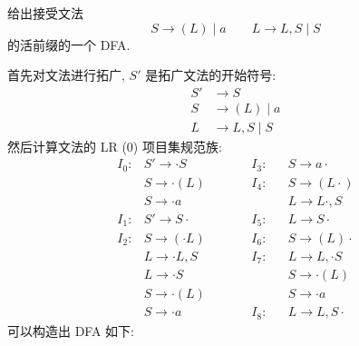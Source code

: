 \documentclass[boxes]{homework}
\begin{document}
\begin{problem}
给出接受文法
\begin{equation}
    \label{eq:17.1}
    S \to (L) \mid a \qquad L \to L, S \mid S
\end{equation}
的活前缀的一个 DFA\@.
\end{problem}
\begin{solution}
    首先对文法进行拓广, $S'$ 是拓广文法的开始符号:
    \begin{equation}
        \begin{aligned}
            S' & \to S           \\
            S  & \to (L) \mid a  \\
            L  & \to L, S \mid S
        \end{aligned}
    \end{equation}
    然后计算文法的 LR (0) 项目集规范族:
    \begin{equation}
        \begin{aligned}
            I_{0} : & S' \to \cdot S    & \qquad & I_{3} : &  & S  \to a \cdot    \\
                    & S  \to \cdot (L)  & \qquad & I_{4} : &  & S  \to (L \cdot ) \\
                    & S  \to \cdot a    & \qquad &         &  & L  \to L \cdot, S \\
            I_{1} : & S' \to S \cdot    & \qquad & I_{5} : &  & L  \to S \cdot    \\
            I_{2} : & S  \to (\cdot L)  & \qquad & I_{6} : &  & S  \to (L) \cdot  \\
                    & L  \to \cdot L, S & \qquad & I_{7} : &  & L  \to L, \cdot S \\
                    & L  \to \cdot S    & \qquad &         &  & S  \to \cdot (L)  \\
                    & S  \to \cdot (L)  & \qquad &         &  & S  \to \cdot a    \\
                    & S  \to \cdot a    & \qquad & I_{8} : &  & L  \to L, S \cdot
        \end{aligned}
    \end{equation}
    可以构造出 DFA 如下:
    \begin{figure}[ht]
        \centering
\end{figure}
\end{solution}
\end{document}
